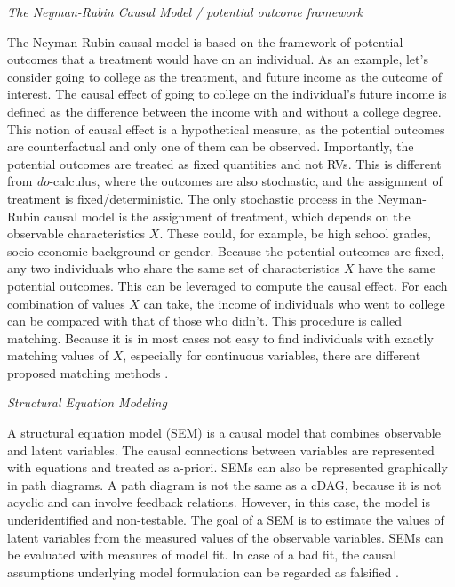 \documentclass[nobib]{tufte-handout}
\newcommand{\docalc}{\emph{do}-calculus\xspace}
\begin{document}
\begin{InfoBox}
\centering
\colorbox{mygray}{
  \centering
  \begin{minipage}{1\textwidth}
    \medskip
    
    \emph{The Neyman-Rubin Causal Model / potential outcome framework}
    \medskip
    
    The Neyman-Rubin causal model is based on the framework of potential outcomes that a treatment would have on an individual. 
    As an example, let's consider going to college as the treatment, and future income as the outcome of interest. 
    The causal effect of going to college on the individual's future income is defined as the difference between the income with and without a college degree. 
    This notion of causal effect is a hypothetical measure, as the potential outcomes are counterfactual and only one of them can be observed.
    Importantly, the potential outcomes are treated as fixed quantities and not RVs.
    This is different from \docalc, where the outcomes are also stochastic, and the assignment of treatment is fixed/deterministic.
    The only stochastic process in the Neyman-Rubin causal model is the assignment of treatment, which depends on the observable characteristics $X$.
    These could, for example, be high school grades, socio-economic background or gender.
    Because the potential outcomes are fixed, any two individuals who share the same set of characteristics $X$ have the same potential outcomes. 
    This can be leveraged to compute the causal effect.
    For each combination of values $X$ can take, the income of individuals who went to college can be compared with that of those who didn't. 
    This procedure is called matching. 
    Because it is in most cases not easy to find individuals with exactly matching values of $X$, especially for continuous variables, there are different proposed matching methods \citep{sekhon2008neyman}.
   
    \medskip

    \emph{Structural Equation Modeling}
    \medskip

    A structural equation model (SEM) is a causal model that combines observable and latent variables.
    The causal connections between variables are represented with equations and treated as a-priori.
    SEMs can also be represented graphically in path diagrams.
    A path diagram is not the same as a cDAG, because it is not acyclic and can involve feedback relations. However, in this case, the model is underidentified and non-testable.
    The goal of a SEM is to estimate the values of latent variables from the measured values of the observable variables. 
    SEMs can be evaluated with measures of model fit. 
    In case of a bad fit, the causal assumptions underlying model formulation can be regarded as falsified \citep{bollen2013eight}. 


\end{minipage}}
\end{InfoBox}
\end{document}
